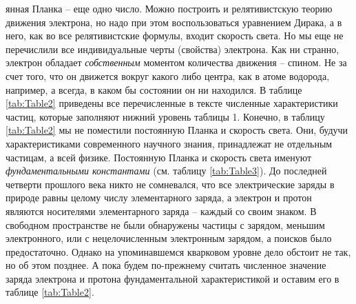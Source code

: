 \fancyhead{} %

\begin{multicols}{2}
\noindent
\fontsize{9pt}{9pt}\selectfont
янная Планка – еще одно число. Можно построить и
релятивистскую теорию движения электрона, но надо
при этом воспользоваться уравнением Дирака, а в него,
как во все релятивистские формулы, входит скорость
света. Но мы еще не перечислили все индивидуальные
черты (свойства) электрона. Как ни странно, электрон
обладает \textit{собственным} моментом количества движения
– спином. Не за счет того, что он движется вокруг
какого либо центра, как в атоме водорода, например,
а всегда, в каком бы состоянии он ни находился. В
таблице \ref{tab:Table2} приведены все перечисленные в тексте численные характеристики частиц, которые заполняют
нижний уровень таблицы 1. Конечно, в таблицу \ref{tab:Table2} мы
не поместили постоянную Планка и скорость света.
Они, будучи характеристиками современного научного
знания, принадлежат не отдельным частицам, а всей
физике. Постоянную Планка и скорость света именуют
\textit{фундаментальными константами} (см. таблицу \ref{tab:Table3}).
До последней четверти прошлого века никто не сомневался, что все электрические заряды в природе равны
целому числу элементарного заряда, а электрон и
протон являются носителями элементарного заряда –
каждый со своим знаком. В свободном пространстве не
были обнаружены частицы с зарядом, меньшим электронного, или с нецелочисленным электронным зарядом, а поисков было предостаточно. Однако на упоминавшемся кварковом уровне дело обстоит не так, но об
этом позднее. А пока будем по-прежнему считать
численное значение заряда электрона и протона фундаментальной характеристикой и оставим его в таблице \ref{tab:Table2}.


\end{multicols}
